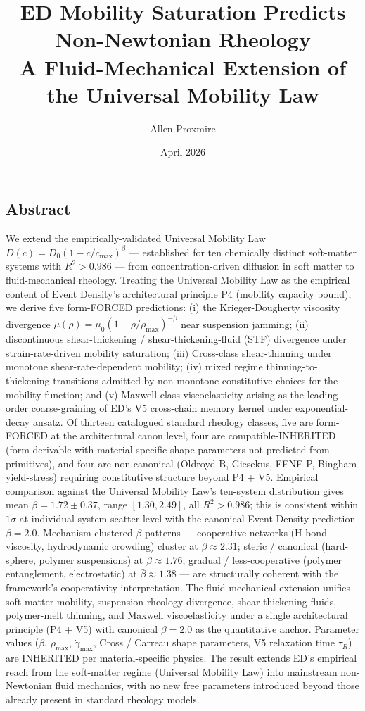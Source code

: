 \documentclass[
  11pt,a4paper]{article}
\title{ED Mobility Saturation Predicts Non-Newtonian Rheology\\
\large A Fluid-Mechanical Extension of the Universal Mobility Law}
\author{Allen Proxmire}
\date{April 2026}
\begin{document}
\maketitle

\subsection{Abstract}\label{abstract}

We extend the empirically-validated Universal Mobility Law
\(D(c) = D_0(1 - c/c_\mathrm{max})^\beta\) --- established for ten
chemically distinct soft-matter systems with \(R^2 > 0.986\) --- from
concentration-driven diffusion in soft matter to fluid-mechanical
rheology. Treating the Universal Mobility Law as the empirical content
of Event Density's architectural principle P4 (mobility capacity bound),
we derive five form-FORCED predictions: (i) the Krieger-Dougherty
viscosity divergence
\(\mu(\rho) = \mu_0(1 - \rho/\rho_\mathrm{max})^{-\beta}\) near
suspension jamming; (ii) discontinuous shear-thickening /
shear-thickening-fluid (STF) divergence under strain-rate-driven
mobility saturation; (iii) Cross-class shear-thinning under monotone
shear-rate-dependent mobility; (iv) mixed regime thinning-to-thickening
transitions admitted by non-monotone constitutive choices for the
mobility function; and (v) Maxwell-class viscoelasticity arising as the
leading-order coarse-graining of ED's V5 cross-chain memory kernel under
exponential-decay ansatz. Of thirteen catalogued standard rheology
classes, five are form-FORCED at the architectural canon level, four are
compatible-INHERITED (form-derivable with material-specific shape
parameters not predicted from primitives), and four are non-canonical
(Oldroyd-B, Giesekus, FENE-P, Bingham yield-stress) requiring
constitutive structure beyond P4 + V5. Empirical comparison against the
Universal Mobility Law's ten-system distribution gives mean
\(\beta = 1.72 \pm 0.37\), range \([1.30, 2.49]\), all \(R^2 > 0.986\);
this is consistent within \(1\sigma\) at individual-system scatter level
with the canonical Event Density prediction \(\beta = 2.0\).
Mechanism-clustered \(\beta\) patterns --- cooperative networks (H-bond
viscosity, hydrodynamic crowding) cluster at \(\bar\beta \approx 2.31\);
steric / canonical (hard-sphere, polymer suspensions) at
\(\bar\beta \approx 1.76\); gradual / less-cooperative (polymer
entanglement, electrostatic) at \(\bar\beta \approx 1.38\) --- are
structurally coherent with the framework's cooperativity interpretation.
The fluid-mechanical extension unifies soft-matter mobility,
suspension-rheology divergence, shear-thickening fluids, polymer-melt
thinning, and Maxwell viscoelasticity under a single architectural
principle (P4 + V5) with canonical \(\beta = 2.0\) as the quantitative
anchor. Parameter values (\(\beta\), \(\rho_\mathrm{max}\),
\(\dot\gamma_\mathrm{max}\), Cross / Carreau shape parameters, V5
relaxation time \(\tau_R\)) are INHERITED per material-specific physics.
The result extends ED's empirical reach from the soft-matter regime
(Universal Mobility Law) into mainstream non-Newtonian fluid mechanics,
with no new free parameters introduced beyond those already present in
standard rheology models.
\end{document}
